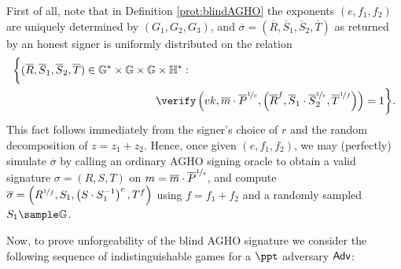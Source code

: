 First of all, note that in Definition \ref{prot:blindAGHO} the exponents $(e, f_1, f_2)$ are uniquely determined by $(G_1,G_2,G_3)$, and   $\overline\sigma=(\overline R, \overline S_1, \overline S_2, \overline T)$ as returned by an honest signer is uniformly distributed on the relation
\begin{align*}
\bigg\{(\overline R, \overline S_1, \overline S_2, \overline T)\in \mathbb G^*\times\mathbb G\times \mathbb G&\times\mathbb H^* : 
\\
&\verify\left(vk, \overline m\cdot \overline P^{\nicefrac{1}{e}}, \left(\overline R^f, \overline S_1\cdot \overline S_2^{\nicefrac{1}{e}}, \overline T^{\nicefrac{1}{f}} \right)\right) = 1\bigg\}. 
\end{align*}
This fact follows immediately from the signer's choice of $r$ and the random decomposition of $z=z_1+z_2$.
Hence, once given $(e, f_1, f_2)$, we may (perfectly) simulate $\overline\sigma$ by calling an ordinary AGHO signing oracle to obtain a valid signature $\sigma = (R,S,T)$ on $m =\overline m\cdot \overline P^{\nicefrac{1}{e}}$, and compute 
$
\overline\sigma= \left(R^{\nicefrac{1}{f}}, S_1, \left(S\cdot S_1^{-1}\right)^e, T^f\right)
$ 
using $f= f_1+f_2$ and a randomly sampled $S_1\sample\mathbb G$.


Now, to prove unforgeability of the blind AGHO signature we consider the following sequence of indistinguishable games for a $\ppt$ adversary $\mathsf{Adv}$:

